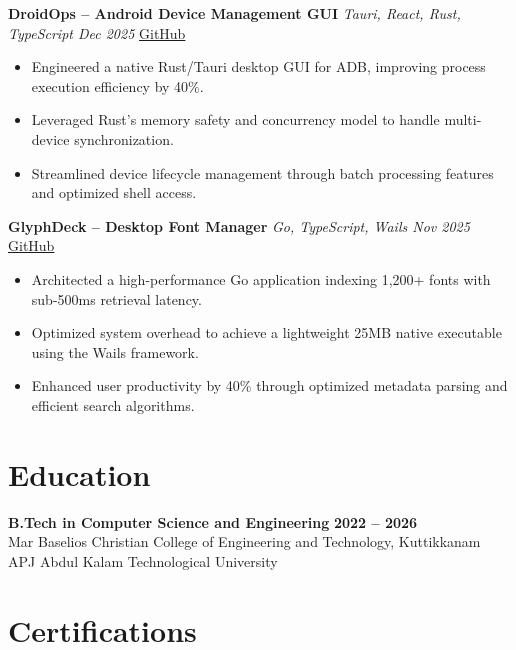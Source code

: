 \documentclass[a4paper,10pt]{article}
\begin{document}
\vspace{2pt}

\textbf{DroidOps -- Android Device Management GUI} \hfill \textit{Tauri, React, Rust, TypeScript \quad Dec 2025} \quad \href{https://github.com/your-github/droidops}{GitHub}
\begin{itemize}
\item Engineered a native Rust/Tauri desktop GUI for ADB, improving process execution efficiency by 40\%.
\item Leveraged Rust's memory safety and concurrency model to handle multi-device synchronization.
\item Streamlined device lifecycle management through batch processing features and optimized shell access.
\end{itemize}

\vspace{2pt}

\textbf{GlyphDeck -- Desktop Font Manager} \hfill \textit{Go, TypeScript, Wails \quad Nov 2025} \quad \href{https://github.com/your-github/GlyphDeck}{GitHub}
\begin{itemize}
\item Architected a high-performance Go application indexing 1,200+ fonts with sub-500ms retrieval latency.
\item Optimized system overhead to achieve a lightweight 25MB native executable using the Wails framework.
\item Enhanced user productivity by 40\% through optimized metadata parsing and efficient search algorithms.
\end{itemize}

\section*{Education}

\textbf{B.Tech in Computer Science and Engineering} \hfill \textbf{2022 -- 2026}\\
Mar Baselios Christian College of Engineering and Technology, Kuttikkanam \hfill APJ Abdul Kalam Technological University

\section*{Certifications}
\end{document}
